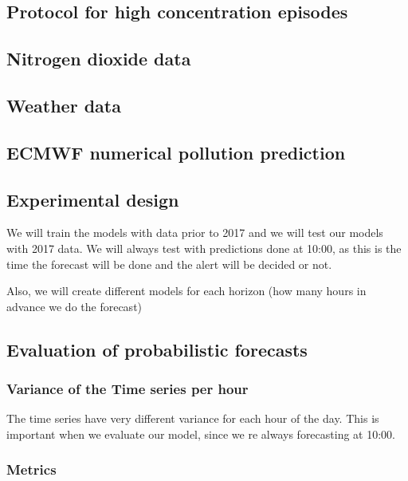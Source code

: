 \documentclass[a4paper,twocolumn,5p]{elsarticle}
\begin{document}
\subsection{Protocol for high \no concentration episodes}
\label{sec:madr-prot-high}


\subsection{Nitrogen dioxide data}
\label{sec:no2}


\subsection{Weather data}
\label{sec:weather-data}

\subsection{ECMWF numerical pollution prediction}
\label{sec:ecmwf-numer-poll}


\subsection{Experimental design}
\label{sec:experimental-design}

We will train the models with data prior to 2017 and we will test our models with 2017 data. We will always test with 
predictions done at 10:00, as this is the time the forecast will be done and the alert will be decided or not.

Also, we will create different models for each horizon (how many hours in advance we do the forecast)

\subsection{Evaluation of probabilistic forecasts}

\subsubsection{Variance of the Time series per hour}

The time series have very different variance for each hour of the day. This is important when we evaluate our model, since
we re always forecasting at 10:00.

\subsubsection{Metrics}
\end{document}
